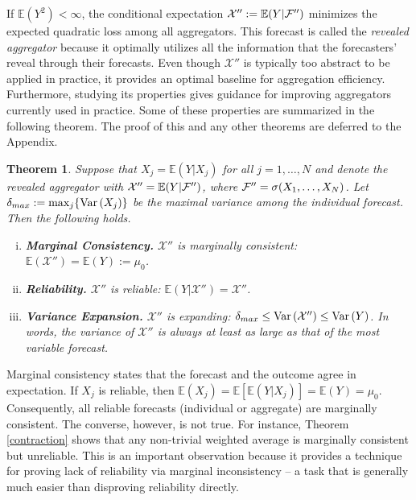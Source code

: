 \documentclass[11pt]{article}
\newcommand{\E}{\mathbb{E}}
\newtheorem{theorem}{Theorem}[section]
\theoremstyle{definition}
\theoremstyle{definition}
\def\F{{\cal F}}
\def\E{{\mathbb E}}
\def\Var{{\rm Var}\,}
\begin{document}



If $\E\left(Y^2\right) < \infty$, the conditional expectation $\mathcal{X}'' := \E(Y | \F'')$ minimizes the expected quadratic loss among all aggregators. This forecast is called the \textit{revealed aggregator} because it optimally utilizes all the information that the forecasters' reveal through their forecasts. Even though $\mathcal{X}'' $ is typically too abstract to be applied in practice, it provides an optimal baseline for aggregation efficiency. Furthermore, studying its properties gives guidance for improving aggregators currently used in practice. Some of these properties are summarized in the following theorem. The proof of this and any other theorems are deferred to the Appendix. 



\begin{theorem} \label{optimal}
Suppose that $X_j = \E(Y | X_j)$ for all $j = 1, \dots, N$ and denote the revealed aggregator with $\mathcal{X}'' = \E(Y | \F'')$, where $\F'' = \sigma(X_1, \dots, X_N)$. 
Let $\delta_{max} := \max_j \{ \Var(X_j)  \}$ be the maximal variance among the individual forecast.
 Then the following holds.
\begin{enumerate}[i)] \label{properties}
\item \textbf{Marginal Consistency.} $\mathcal{X}''$ is marginally consistent:  $\E(\mathcal{X}'') = \E(Y) :=  \mu_0$.
\item \textbf{Reliability.} $\mathcal{X}''$ is reliable: $\E(Y|\mathcal{X}'') = \mathcal{X}''$. 
\item \textbf{Variance Expansion.} $\mathcal{X}''$ is expanding: $\delta_{max} \leq \Var(\mathcal{X}'') \leq \Var(Y)$. In words, the variance of $\mathcal{X}''$ is always at least as large as that of the most variable forecast. 
\end{enumerate}
\end{theorem}
Marginal consistency states that the forecast and the outcome agree in expectation. If $X_j$ is reliable, then $\E(X_j) = \E[\E(Y|X_j)] = \E(Y) = \mu_0$. Consequently, all reliable forecasts (individual or aggregate) are marginally consistent. The converse, however, is not true. For instance, Theorem \ref{contraction} shows that any non-trivial weighted average is marginally consistent but unreliable. This is an important observation because it provides a technique for proving lack of reliability via marginal inconsistency -- a task that is generally much easier than disproving reliability directly.
\end{document}
